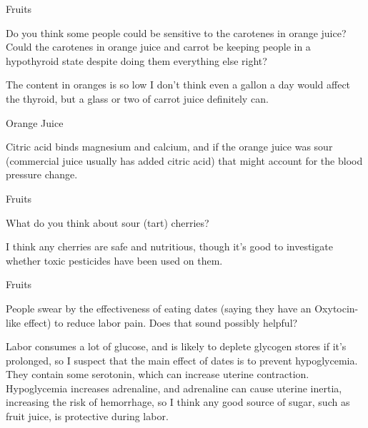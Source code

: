 \documentclass[11pt,oneside,openany,extrafontsizes]{memoir}
\begin{document}
\begin{qaexchange}{Fruits}

    \begin{question}
        Do you think some people could be sensitive to the carotenes in orange juice? Could the carotenes in orange juice and carrot be keeping people in a hypothyroid state despite doing them everything else right?
    \end{question}

    \begin{answer}
        The content in oranges is so low I don't think even a gallon a day would affect the thyroid, but a glass or two of carrot juice definitely can.
    \end{answer}
\end{qaexchange}

\begin{standalonequote}{Orange Juice}

    \begin{answer}
        Citric acid binds magnesium and calcium, and if the orange juice was sour (commercial juice usually has added citric acid) that might account for the blood pressure change.
    \end{answer}
\end{standalonequote}

\begin{qaexchange}{Fruits}

    \begin{question}
        What do you think about sour (tart) cherries?
    \end{question}

    \begin{answer}
        I think any cherries are safe and nutritious, though it's good to investigate whether toxic pesticides have been used on them.
    \end{answer}
\end{qaexchange}

\begin{qaexchange}{Fruits}

    \begin{question}
        People swear by the effectiveness of eating dates (saying they have an Oxytocin-like effect) to reduce labor pain. Does that sound possibly helpful?
    \end{question}

    \begin{answer}
        Labor consumes a lot of glucose, and is likely to deplete glycogen stores if it's prolonged, so I suspect that the main effect of dates is to prevent hypoglycemia. They contain some serotonin, which can increase uterine contraction. Hypoglycemia increases adrenaline, and adrenaline can cause uterine inertia, increasing the risk of hemorrhage, so I think any good source of sugar, such as fruit juice, is protective during labor.
    \end{answer}
\end{qaexchange}
\end{document}
